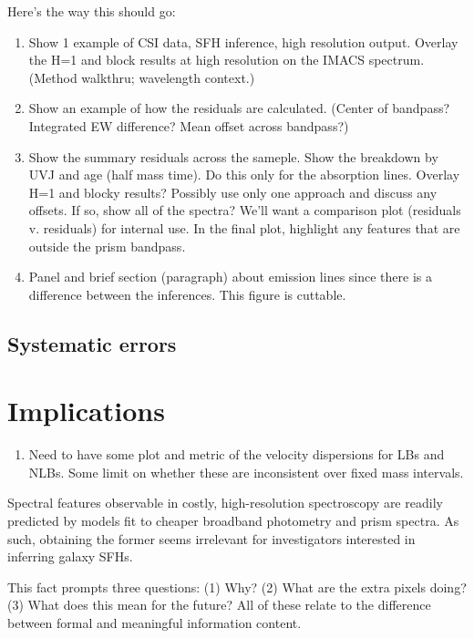 \documentclass[a4paper,fleqn,usenatbib]{mnras}
\newcommand{\benum}{\begin{enumerate}}
\newcommand{\eenum}{\end{enumerate}}
\begin{document}
Here's the way this should go:
\benum
	\item Show 1 example of CSI data, SFH inference, high resolution output. Overlay the H=1 and block
		results at high resolution on the IMACS spectrum. (Method walkthru; wavelength context.)
	\item Show an example of how the residuals are calculated. (Center of bandpass? Integrated EW
		difference? Mean offset across bandpass?)
	\item Show the summary residuals across the sameple. Show the breakdown by UVJ and age 
		(half mass time). 	Do this only for the absorption lines. Overlay H=1 and blocky results? Possibly use
		only one approach and discuss any offsets. If so, show all of the spectra? We'll want a comparison 
		plot (residuals v. residuals) for internal use. In the final plot, highlight any features that are 
		outside the 	prism bandpass.
	\item Panel and brief section (paragraph) about emission lines since there is a difference between
		the inferences. This figure is cuttable.
\eenum
\fi



\subsection{Systematic errors}
\label{sec:systematics}



\section{Implications}
\label{sec:discussion}

\benum
	\item Need to have some plot and metric of the velocity dispersions for LBs and NLBs. Some
		limit on whether these are inconsistent over fixed mass intervals.
\eenum


Spectral features observable in costly, high-resolution spectroscopy are readily predicted by 
models fit to cheaper broadband photometry and prism spectra. As such, obtaining the former 
seems irrelevant for investigators interested in inferring galaxy SFHs.

This fact prompts three questions: (1) Why? (2) What are the extra pixels doing? (3) What does
this mean for the future? All of these relate to the difference between formal and meaningful 
information content.
\end{document}
